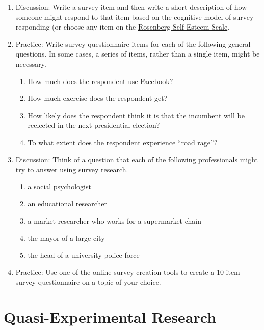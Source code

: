 \documentclass[
]{krantz}
\providecommand{\tightlist}{%
  \setlength{\itemsep}{0pt}\setlength{\parskip}{0pt}}
\begin{document}
\begin{enumerate}
\def\labelenumi{\arabic{enumi}.}
\tightlist
\item
  Discussion: Write a survey item and then write a short description of how someone might respond to that item based on the cognitive model of survey responding (or choose any item on the \href{https://socy.umd.edu/about-us/using-rosenberg-self-esteem-scale}{Rosenberg Self-Esteem Scale}.
\item
  Practice: Write survey questionnaire items for each of the following general questions. In some cases, a series of items, rather than a single item, might be necessary.

  \begin{enumerate}
  \def\labelenumii{\alph{enumii}.}
  \tightlist
  \item
    How much does the respondent use Facebook?
  \item
    How much exercise does the respondent get?
  \item
    How likely does the respondent think it is that the incumbent will be reelected in the next presidential election?
  \item
    To what extent does the respondent experience ``road rage''?
  \end{enumerate}
\item
  Discussion: Think of a question that each of the following professionals might try to answer using survey research.

  \begin{enumerate}
  \def\labelenumii{\alph{enumii}.}
  \tightlist
  \item
    a social psychologist
  \item
    an educational researcher
  \item
    a market researcher who works for a supermarket chain
  \item
    the mayor of a large city
  \item
    the head of a university police force
  \end{enumerate}
\item
  Practice: Use one of the online survey creation tools to create a 10-item survey questionnaire on a topic of your choice.
\end{enumerate}

\hypertarget{quasi-experimental-research}{%
\section{Quasi-Experimental Research}\label{quasi-experimental-research}}
\end{document}
